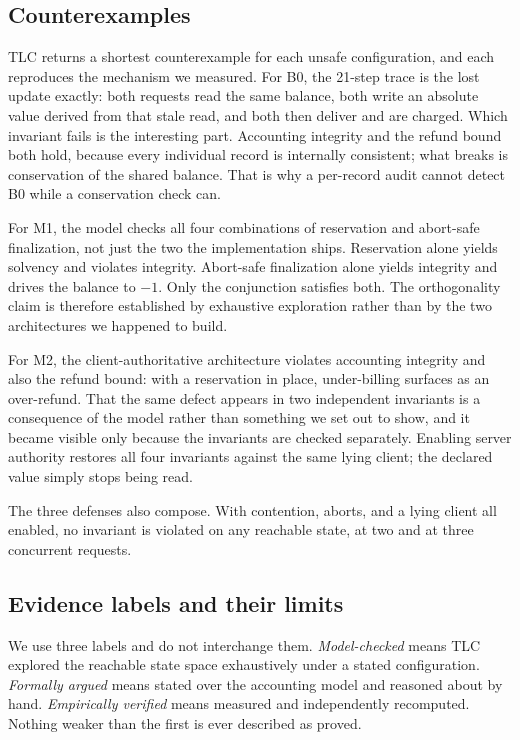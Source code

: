 \documentclass[preprint,3p,authoryear,12pt]{elsarticle}
\begin{document}
\subsection{Counterexamples}
TLC returns a shortest counterexample for each unsafe configuration, and each reproduces
the mechanism we measured. For B0, the 21-step trace is the lost update exactly: both
requests read the same balance, both write an absolute value derived from that stale
read, and both then deliver and are charged. Which invariant fails is the interesting
part. Accounting integrity and the refund bound both hold, because every individual
record is internally consistent; what breaks is conservation of the shared balance. That
is why a per-record audit cannot detect B0 while a conservation check can.

For M1, the model checks all four combinations of reservation and abort-safe
finalization, not just the two the implementation ships. Reservation alone yields
solvency and violates integrity. Abort-safe finalization alone yields integrity and
drives the balance to $-1$. Only the conjunction satisfies both. The orthogonality claim
is therefore established by exhaustive exploration rather than by the two architectures
we happened to build.

For M2, the client-authoritative architecture violates accounting integrity and also the
refund bound: with a reservation in place, under-billing surfaces as an over-refund. That
the same defect appears in two independent invariants is a consequence of the model
rather than something we set out to show, and it became visible only because the
invariants are checked separately. Enabling server authority restores all four invariants
against the same lying client; the declared value simply stops being read.

The three defenses also compose. With contention, aborts, and a lying client all enabled,
no invariant is violated on any reachable state, at two and at three concurrent requests.

\subsection{Evidence labels and their limits}
We use three labels and do not interchange them. \emph{Model-checked} means TLC explored
the reachable state space exhaustively under a stated configuration. \emph{Formally
argued} means stated over the accounting model and reasoned about by hand.
\emph{Empirically verified} means measured and independently recomputed. Nothing weaker
than the first is ever described as proved.
\end{document}
